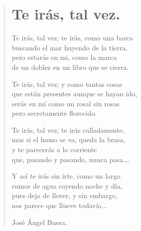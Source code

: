 \documentclass[11pt, portrait, twoside, notitlepage, openright]{book}
\begin{document}
\newpage
\begin{verse}
\begin{center}
\section{Te irás, tal vez.}
\end{center}
Te irás, tal vez; te irás, como una barca\\
buscando el mar huyendo de la tierra,\\
pero estarás en mi, como la marca\\
de un doblez en un libro que se cierra.
\newline

Te irás, tal vez; y como tantas cosas\\
que están presentes aunque se hayan ido,\\
serás en mí como un rosal sin rosas\\
pero secretamente florecido.
\newline

Te irás, tal vez; te irás calladamente,\\
mas si el humo se va, queda la brasa,\\
y te parecerás a la corriente\\
que, pasando y pasando, nunca pasa….
\newline

Y así te irás sin irte, como un largo\\
rumor de agua cayendo noche y día,\\
pues deja de llover, y sin embargo,\\
nos parece que llueve todavía...
\newline

José Ángel Buesa.
\end{verse}
\end{document}
